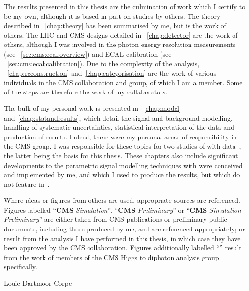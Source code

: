 \begin{declaration}

The results presented in this thesis are the culmination of work which I certify to be my own, although it is based in part on studies by others. The theory described in \Chap~\ref{chap:theory} has been summarised by me, but is the work of others. The LHC and CMS designs detailed in \Chap~\ref{chap:detector} are the work of others, although I was involved in the \RunI photon energy resolution measurements (see \Sec~\ref{sec:cms:ecal:overview}) and \RunII ECAL calibration (see \Sec~\ref{sec:cms:ecal:calibration}).
Due to the complexity of the analysis, \Chap\s~\ref{chap:reconstruction} and~\ref{chap:categorisation} are the work of various individuals in the CMS collaboration and \Hgg group, of which I am a member. Some of the steps are therefore the work of my collaborators.

The bulk of my personal work is presented in \Chap\s~\ref{chap:model} and~\ref{chap:statandresults}, which detail the signal and background modelling, handling of systematic uncertainties, statistical interpretation of the data and production of results. Indeed, these were my personal areas of responsibility in the CMS \Hgg group. I was responsible for these topics for two studies of \Hgg with \RunII data~\cite{CMS-PAS-HIG-15-005,CMS-PAS-HIG-16-020}, the latter being the basis for this thesis. These chapters also include significant developments to the parametric signal modelling techniques with were conceived and implemented by me, and which I used to produce the results, but which do not feature in~\cite{CMS-PAS-HIG-16-020}.  

Where ideas or figures from others are used, appropriate sources are referenced. Figures labelled ``\textbf{CMS} \emph{Simulation}'', ``\textbf{CMS} \emph{Preliminary}'' or ``\textbf{CMS} \emph{Simulation Preliminary}'' are either taken from CMS publications or preliminary public documents, including those produced by me, and are referenced appropriately; or result from the analysis I have performed in this thesis, in which case they have been approved by the CMS collaboration. Figures additionally labelled ``\Hgg'' result from the work of members of the CMS Higgs to diphoton analysis group specifically.
  \begin{flushright}
    Louie Dartmoor Corpe
  \end{flushright}
\end{declaration}


